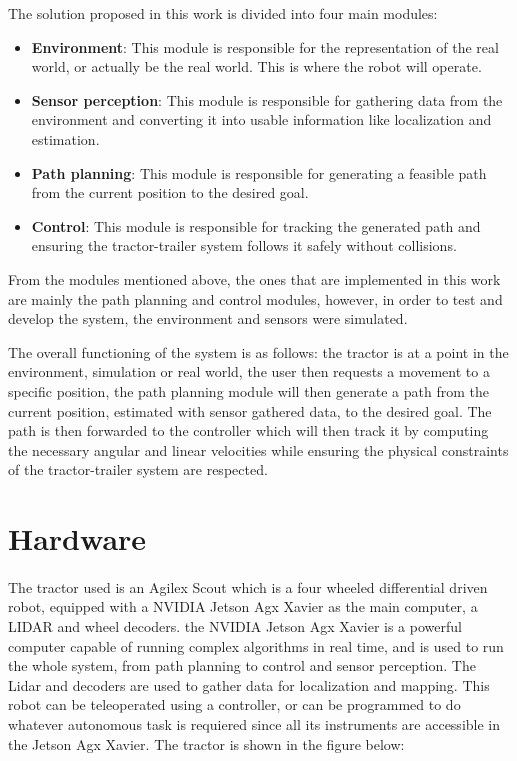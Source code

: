The solution proposed in this work is divided into four main modules:
\begin{itemize}
    \item \textbf{Environment}: This module is responsible for the representation of the real world, or actually be the real world. This is where the robot will operate.
    \item \textbf{Sensor perception}: This module is responsible for gathering data from the environment and converting it into usable information like localization and estimation.
    \item \textbf{Path planning}: This module is responsible for generating a feasible path from the current position to the desired goal.
    \item \textbf{Control}: This module is responsible for tracking the generated path and ensuring the tractor-trailer system follows it safely without collisions.
\end{itemize}

From the modules mentioned above, the ones that are implemented in this work are mainly 
the path planning and control modules, however, in order to test and develop the system, 
the environment and sensors were simulated.

The overall functioning of the system is as follows: the tractor is at a point in the environment, simulation or real world, 
the user then requests a movement to a specific position, the path planning module will then generate a path from the current 
position, estimated with sensor gathered data, to the desired goal. The path is then forwarded to the 
controller which will then track it by computing the necessary angular and linear velocities while ensuring the 
physical constraints of the tractor-trailer system are respected.
 


\section{Hardware}
\label{sec:hardware}

\paragraph{}The tractor used is an Agilex Scout which is a four wheeled differential driven robot, 
equipped with a NVIDIA Jetson Agx Xavier as the main computer, a LIDAR and wheel decoders. 
the NVIDIA Jetson Agx Xavier is a powerful computer capable of running complex algorithms in real time, 
and is used to run the whole system, from path planning to control and sensor 
perception. The Lidar and decoders are used to gather data for localization and mapping. This 
robot can be teleoperated using a controller, or can be programmed 
to do whatever autonomous task is requiered since all its instruments 
are accessible in the Jetson Agx Xavier. The tractor is shown in the figure below:

